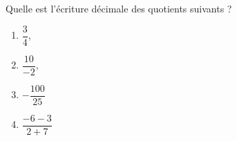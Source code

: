 
\begin{exercice}\label{exosmath-0749}

    Quelle est l'écriture décimale des quotients suivants ?
    \begin{multicols}{2}
        \begin{enumerate}
            \item
                \( \dfrac{ 3 }{ 4 }\),
            \item
                $\dfrac{10}{-2}$,
            \item
                \( -\dfrac{ 100 }{ 25 }\)
            \item
                \( \dfrac{ -6-3 }{ 2+7 }\)
        \end{enumerate}
    \end{multicols}

\end{exercice}
